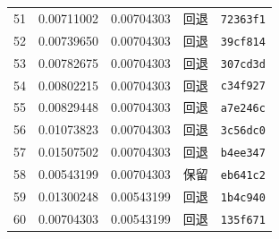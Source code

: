 \begin{longtable}{rrrll}
51 & 0.00711002 & 0.00704303 & 回退 & \texttt{72363f1} \\
52 & 0.00739650 & 0.00704303 & 回退 & \texttt{39cf814} \\
53 & 0.00782675 & 0.00704303 & 回退 & \texttt{307cd3d} \\
54 & 0.00802215 & 0.00704303 & 回退 & \texttt{c34f927} \\
55 & 0.00829448 & 0.00704303 & 回退 & \texttt{a7e246c} \\
56 & 0.01073823 & 0.00704303 & 回退 & \texttt{3c56dc0} \\
57 & 0.01507502 & 0.00704303 & 回退 & \texttt{b4ee347} \\
58 & 0.00543199 & 0.00704303 & 保留 & \texttt{eb641c2} \\
59 & 0.01300248 & 0.00543199 & 回退 & \texttt{1b4c940} \\
60 & 0.00704303 & 0.00543199 & 回退 & \texttt{135f671} \\
\bottomrule
\end{longtable}
